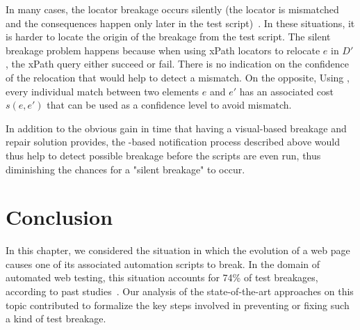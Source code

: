 In many cases, the locator breakage occurs silently (the locator is mismatched
and the consequences happen only later in the test
script)~\cite{stocco2018visual}. In these situations, it is harder to locate the
origin of the breakage from the test script. The silent breakage problem happens
because when using xPath locators to relocate $e$ in $D'$, the xPath query
either succeed or fail. There is no indication on the confidence of the
relocation that would help to detect a mismatch. On the opposite, Using
\erratum{}, every individual match between two elements $e$ and $e'$ has an
associated cost $s(e, e')$ that can be used as a confidence level to avoid
mismatch.

In addition to the obvious gain in time that having a visual-based breakage and
repair solution provides, the \erratum-based notification process described
above would thus help to detect possible breakage before the scripts are even
run, thus diminishing the chances for a "silent breakage" to occur.


\section{Conclusion}\label{sec:conclusion}
In this chapter, we considered the situation in which the evolution of a web page causes one of its associated automation scripts to break.
In the domain of automated web testing, this situation accounts for 74\% of test breakages, according to past studies~\cite{hammoudi2016record}.
% 
Our analysis of the state-of-the-art approaches on this topic contributed to formalize the key steps involved in preventing or fixing such a kind of test breakage.

